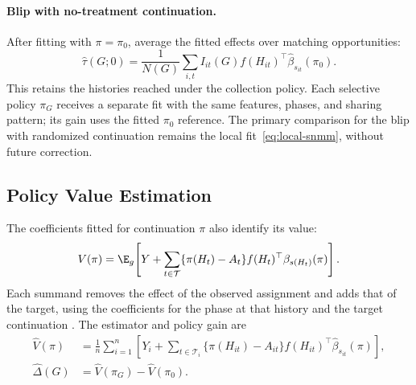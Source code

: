 \paragraph{Blip with no-treatment continuation.}
After fitting with $\pi=\pi_0$, average the fitted effects over matching
opportunities:
\begin{equation}
 \widehat\tau(G;0)=\frac{1}{N(G)}\sum_{i,t}I_{it}(G)
     f(H_{it})^\top\widehat\beta_{s_{it}}(\pi_0).
 \label{eq:no-future-estimate}
\end{equation}
This retains the histories reached under the collection policy. Each selective
policy $\pi_G$ receives a separate fit with the same features, phases, and sharing
pattern; its gain uses the fitted $\pi_0$ reference. The primary comparison for the blip with randomized
continuation remains the local fit~\eqref{eq:local-snmm}, without future correction.

\subsection{Policy Value Estimation}
\label{app:value}

The coefficients fitted for continuation $\pi$ also identify its value:
\begin{equation}
 V(\pi)=\E_g\!\left[Y+\sum_{t\in\mathcal T}
    \{\pi(H_t)-A_t\}f(H_t)^\top\beta_{s(H_t)}(\pi)\right].
 \label{eq:value-identity}
\end{equation}
Each summand removes the effect of the observed assignment and adds that of the target, using the coefficients for the phase at that history and the target continuation \citep[Lemma~6]{lewis2021dynamic}. The estimator and policy gain are
\begin{equation}
\begin{aligned}
 \widehat V(\pi)&=\frac1n\sum_{i=1}^n\left[Y_i+
    \sum_{t\in\mathcal T_i}\{\pi(H_{it})-A_{it}\}
      f(H_{it})^\top\widehat\beta_{s_{it}}(\pi)\right],\\
 \widehat\Delta(G)&=\widehat V(\pi_G)-\widehat V(\pi_0).
\end{aligned}
\label{eq:value-estimator}
\end{equation}


